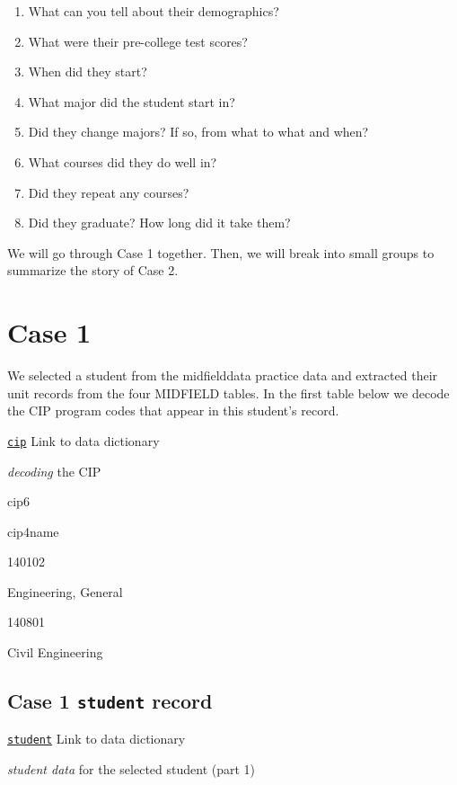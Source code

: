 \documentclass[
]{book}
\providecommand{\tightlist}{%
  \setlength{\itemsep}{0pt}\setlength{\parskip}{0pt}}
\begin{document}
\begin{enumerate}
\def\labelenumi{\arabic{enumi}.}
\tightlist
\item
  What can you tell about their demographics?
\item
  What were their pre-college test scores?
\item
  When did they start?
\item
  What major did the student start in?
\item
  Did they change majors? If so, from what to what and when?
\item
  What courses did they do well in?
\item
  Did they repeat any courses?
\item
  Did they graduate? How long did it take them?
\end{enumerate}

We will go through Case 1 together. Then, we will break into small groups to summarize the story of Case 2.

\hypertarget{case-1}{%
\section{Case 1}\label{case-1}}

We selected a student from the midfielddata practice data and extracted their unit records from the four MIDFIELD tables. In the first table below we decode the CIP program codes that appear in this student's record.

\href{https://midfieldr.github.io/midfieldr/reference/cip.html}{\texttt{cip}} Link to data dictionary

\emph{decoding} the CIP

cip6

cip4name

140102

Engineering, General

140801

Civil Engineering

\hypertarget{case-1-student-record}{%
\subsection{\texorpdfstring{Case 1 \texttt{student} record}{Case 1 student record}}\label{case-1-student-record}}

\href{https://midfieldr.github.io/midfielddata/reference/student.html}{\texttt{student}} Link to data dictionary

\emph{student data} for the selected student (part 1)
\end{document}
